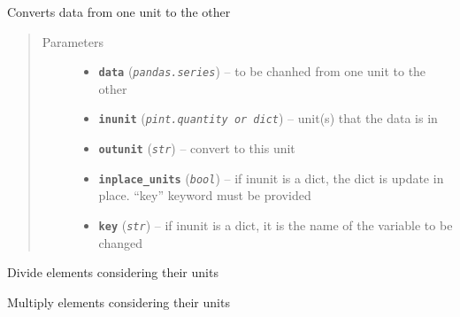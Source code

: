 \documentclass[a4paper,10pt,oneside]{sphinxmanual}
\begin{document}
\begin{fulllineitems}
\label{pymicra.algs:pymicra.algs.units.convert_to}
Converts data from one unit to the other
\begin{quote}\begin{description}
\item[{Parameters}] \leavevmode\begin{itemize}
\item {} 
\textbf{\texttt{data}} (\emph{\texttt{pandas.series}}) -- to be chanhed from one unit to the other

\item {} 
\textbf{\texttt{inunit}} (\emph{\texttt{pint.quantity or dict}}) -- unit(s) that the data is in

\item {} 
\textbf{\texttt{outunit}} (\emph{\texttt{str}}) -- convert to this unit

\item {} 
\textbf{\texttt{inplace\_units}} (\emph{\texttt{bool}}) -- if inunit is a dict, the dict is update in place. ``key'' keyword must be provided

\item {} 
\textbf{\texttt{key}} (\emph{\texttt{str}}) -- if inunit is a dict, it is the name of the variable to be changed

\end{itemize}

\end{description}\end{quote}

\end{fulllineitems}


\begin{fulllineitems}
\label{pymicra.algs:pymicra.algs.units.divide}
Divide elements considering their units

\end{fulllineitems}


\begin{fulllineitems}
\label{pymicra.algs:pymicra.algs.units.multiply}
Multiply elements considering their units

\end{fulllineitems}
\end{document}
